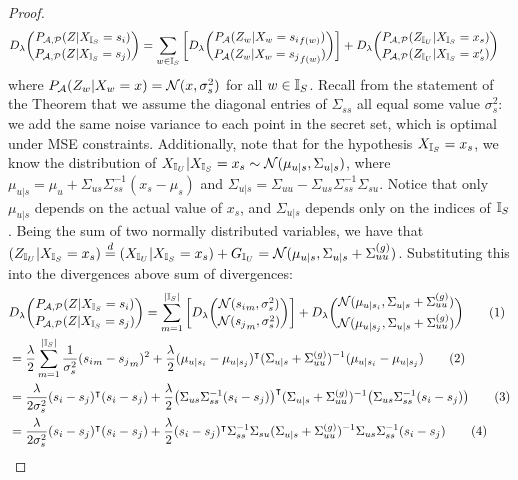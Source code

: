 \begin{proof}
\begin{align*}
	D_\lambda \binom{P_{\mathcal{A}, \mathcal{P}}(Z | {X_{\mathbb{I}_S}} = s_i)}{P_{\mathcal{A}, \mathcal{P}}(Z | {X_{\mathbb{I}_S}} = s_j)}
	&= \sum_{w \in {\mathbb{I}_S}} \bigg[ D_\lambda \binom{P_{\mathcal{A}}(Z_w | X_w = {s_i}_{f(w)})}{P_{\mathcal{A}}(Z_w | X_w = {s_j}_{f(w)})} \bigg]
	+ D_\lambda \binom{P_{\mathcal{A}, \mathcal{P}}({Z_{\mathbb{I}_U}} | {X_{\mathbb{I}_S}} = x_s)}{P_{\mathcal{A}, \mathcal{P}}({Z_{\mathbb{I}_U}} | {X_{\mathbb{I}_S}} = x_s')} 
\end{align*}
where $P_{\mathcal{A}}(Z_w | X_w = x) = \mathcal{N}(x, \sigma_s^2)$ for all $w \in {\mathbb{I}_S}$. Recall from the statement of the Theorem that we assume the diagonal entries of $\Sigma_{ss}$ all equal some value $\sigma_s^2$: we add the same noise variance to each point in the secret set, which is optimal under MSE constraints. Additionally, note that for the hypothesis ${X_{\mathbb{I}_S}} = x_s$, we know the distribution of ${X_{\mathbb{I}_U}} | {X_{\mathbb{I}_S}} = x_s \sim \mathcal{N}(\mu_{u|s}, \Sigma_{u|s})$, where $\mu_{u|s} = \mu_u + \Sigma_{us} \Sigma_{ss}^{-1} (x_s - \mu_s)$ and $\Sigma_{u|s} = \Sigma_{uu} - \Sigma_{us}\Sigma_{ss}^{-1} \Sigma_{su}$. Notice that only $\mu_{u|s}$ depends on the actual value of $x_s$, and $\Sigma_{u|s}$ depends only on the indices of ${\mathbb{I}_S}$. Being the sum of two normally distributed variables, we have that $({Z_{\mathbb{I}_U}} | {X_{\mathbb{I}_S}} = x_s) \overset{d}{=} ({X_{\mathbb{I}_U}}|{X_{\mathbb{I}_S}} = x_s) + {G_{\mathbb{I}_U}} = \mathcal{N}(\mu_{u|s}, \Sigma_{u|s} + \Sigma^{(g)}_{uu})$. Substituting this into the divergences above sum of divergences: 
\begin{align}
	&D_\lambda \binom{P_{\mathcal{A}, \mathcal{P}}(Z | {X_{\mathbb{I}_S}} = s_i)}{P_{\mathcal{A}, \mathcal{P}}(Z | {X_{\mathbb{I}_S}} = s_j)}
	= \sum_{m =1}^{|{\mathbb{I}_S}|} \bigg[ D_\lambda \binom{\mathcal{N}({s_i}_m, \sigma_s^2)}{\mathcal{N}({s_j}_m, \sigma_s^2)} \bigg]
	+ D_\lambda \binom{\mathcal{N}(\mu_{u|s_i}, \Sigma_{u|s} + \Sigma^{(g)}_{uu})}{\mathcal{N}(\mu_{u|s_j}, \Sigma_{u|s} + \Sigma^{(g)}_{uu})} \tag{1} \\
	&=  \frac{\lambda}{2} \sum_{m = 1}^{|{\mathbb{I}_S}|}  \frac{1}{\sigma_s^2} ({s_i}_m - {s_j}_m)^2 
	+  \frac{\lambda}{2} (\mu_{u|s_i} - \mu_{u|s_j})^\intercal (\Sigma_{u|s} + \Sigma^{(g)}_{uu})^{-1} (\mu_{u|s_i} - \mu_{u|s_j})  \tag{2} \\
	&=  \frac{\lambda}{2 \sigma_s^2}   ({s_i} - {s_j})^\intercal({s_i} - {s_j}) 
	+  \frac{\lambda}{2} \big( \Sigma_{us} \Sigma_{ss}^{-1}(s_i - s_j) \big)^\intercal (\Sigma_{u|s} + \Sigma^{(g)}_{uu})^{-1} \big( \Sigma_{us} \Sigma_{ss}^{-1}(s_i - s_j) \big)  \tag{3}  \\
	&= \frac{\lambda}{2 \sigma_s^2}   ({s_i} - {s_j})^\intercal({s_i} - {s_j}) 
	+  \frac{\lambda}{2} (s_i - s_j)^\intercal \Sigma_{ss}^{-1} \Sigma_{su}  (\Sigma_{u|s} + \Sigma^{(g)}_{uu})^{-1} \Sigma_{us} \Sigma_{ss}^{-1} (s_i - s_j) \tag{4} 
\end{align}

\end{proof}
